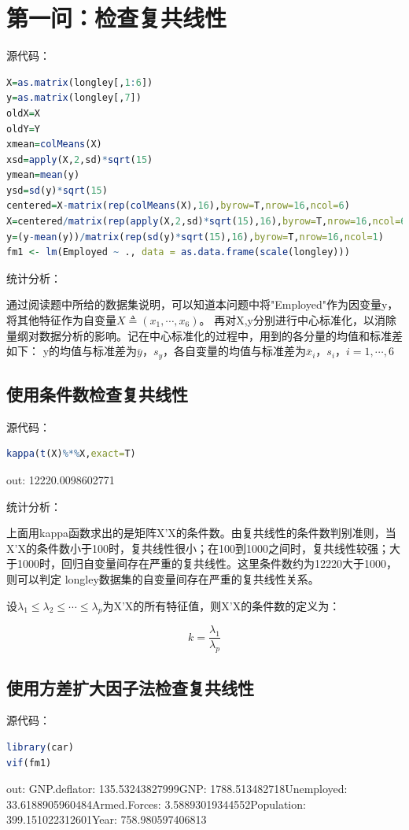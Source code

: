 \documentclass[a4paper,12pt]{article}
\begin{document}
\section{第一问：检查复共线性}

源代码：

\begin{lstlisting}[language=r,breaklines]
X=as.matrix(longley[,1:6])
y=as.matrix(longley[,7])
oldX=X
oldY=Y
xmean=colMeans(X)
xsd=apply(X,2,sd)*sqrt(15)
ymean=mean(y)
ysd=sd(y)*sqrt(15)
centered=X-matrix(rep(colMeans(X),16),byrow=T,nrow=16,ncol=6)
X=centered/matrix(rep(apply(X,2,sd)*sqrt(15),16),byrow=T,nrow=16,ncol=6)
y=(y-mean(y))/matrix(rep(sd(y)*sqrt(15),16),byrow=T,nrow=16,ncol=1)
fm1 <- lm(Employed ~ ., data = as.data.frame(scale(longley)))	
\end{lstlisting}

统计分析：

通过阅读题中所给的数据集说明，可以知道本问题中将"Employed"作为因变量y，将其他特征作为自变量$X\triangleq (x_1,\cdots,x_6)$。
再对X,y分别进行中心标准化，以消除量纲对数据分析的影响。记在中心标准化的过程中，用到的各分量的均值和标准差如下：
y的均值与标准差为$\bar{y}$，$s_y$，各自变量的均值与标准差为$\bar{x}_i$，$s_i$，$i=1,\cdots,6$

\subsection{使用条件数检查复共线性}
源代码：
\begin{lstlisting}[language=r,breaklines]
kappa(t(X)%*%X,exact=T)
\end{lstlisting}
out: 12220.0098602771

统计分析：

上面用kappa函数求出的是矩阵X'X的条件数。由复共线性的条件数判别准则，当X'X的条件数小于100时，复共线性很小；在100到1000之间时，复共线性较强；大于1000时，回归自变量间存在严重的复共线性。这里条件数约为12220大于1000，则可以判定
longley数据集的自变量间存在严重的复共线性关系。

设$\lambda_1\leq \lambda_2 \leq \cdots \leq \lambda_p$为X'X的所有特征值，则X'X的条件数的定义为：

$$k=\frac{\lambda_1}{\lambda_p}$$

\subsection{使用方差扩大因子法检查复共线性}

源代码：

\begin{lstlisting}[language=r,breaklines]
library(car)
vif(fm1)
\end{lstlisting}
out: GNP.deflator: 135.53243827999\quad GNP: 1788.513482718\quad Unemployed: 33.6188905960484\quad Armed.Forces: 3.58893019344552\quad Population: 399.151022312601\quad Year: 758.980597406813
\end{document}

